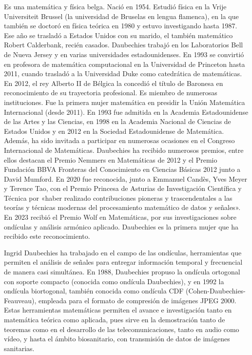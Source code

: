  \bigskip
{}
\begin{parchment} {Es una matemática y física belga. Nació en 1954. Estudió física en la Vrije Universiteit Brussel (la universidad de Bruselas en lengua flamenca), en la que también se doctoró en física teórica en 1980 y estuvo investigando hasta 1987. Ese año se trasladó a Estados Unidos con su marido, el también matemático Robert Calderbank, recién casados. Daubechies trabajó en los Laboratorios Bell de Nueva Jersey y en varias universidades estadounidenses. En 1993 se convirtió en profesora de matemática computacional en la Universidad de Princeton hasta 2011, cuando trasladó a la Universidad Duke como catedrática de matemáticas.
En 2012, el rey Alberto II de Bélgica la concedió el título de Baronesa en reconocimiento de su trayectoria profesional.
Es miembro de numerosas instituciones. Fue la primera mujer matemática en presidir la Unión Matemática Internacional (desde 2011). En 1993 fue admitida en la Academia Estadounidense de las Artes y las Ciencias, en 1998 en la Academia Nacional de Ciencias de Estados Unidos y en 2012 en la Sociedad Estadounidense de Matemática. Además, ha sido invitada a participar en numerosas ocasiones en el Congreso Internacional de Matemáticas.
Daubechies ha recibido numerosos premios, entre ellos destacan el Premio Nemmers en Matemáticas de 2012 y el Premio Fundación BBVA Fronteras del Conocimiento en Ciencias Básicas 2012 junto a David Mumford.
En 2020 fue reconocida, junto a Emmanuel Candès, Yves Meyer y Terence Tao, con el Premio Princesa de Asturias de Investigación Científica y Técnica por «haber realizado contribuciones pioneras y trascendentales a las teorías y técnicas modernas del procesamiento matemático de datos y señales».
En 2023 recibió el Premio Wolf en Matemáticas, por sus investigaciones sobre ondículas y análisis armónico aplicado. Daubechies es la primera mujer que ha recibido este reconocimiento.

Ingrid Daubechies ha trabajado en el campo de las ondículas, herramientas que permiten el análisis de señales para entregar información temporal y frecuencial de manera casi simultánea. En 1988, Daubechies propuso la ondícula ortogonal con soporte compacto (conocida como ondícula Daubechies), y en 1992 la ondícula biortogonal, también conocida como ondícula CDF (Cohen-Daubechies-Feauveau), empleada para el formato de compresión de imágenes JPEG 2000.
Estas herramientas matemáticas permiten el avance e investigación tanto en matemática teórica como aplicada, pues sirve en la demostración tanto de teoremas como en el desarrollo de las telecomunicaciones, tanto en audio como vídeo, y hasta el ámbito biosanitario, con transmisión de datos de imágenes sanitarias. \cite{IngridD}  }
\end{parchment}

